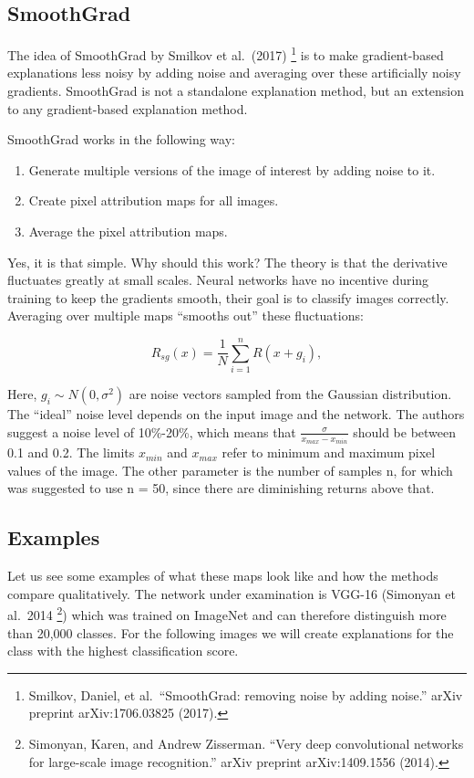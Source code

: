 \documentclass[
  10pt,
]{scrbook}
\providecommand{\tightlist}{%
  \setlength{\itemsep}{0pt}\setlength{\parskip}{0pt}}
\begin{document}
\hypertarget{smoothgrad}{%
\subsection{SmoothGrad}\label{smoothgrad}}

The idea of SmoothGrad by Smilkov et al.~(2017) \footnote{Smilkov, Daniel, et al.~``SmoothGrad: removing noise by adding noise.'' arXiv preprint arXiv:1706.03825 (2017).} is to make gradient-based explanations less noisy by adding noise and averaging over these artificially noisy gradients.
SmoothGrad is not a standalone explanation method, but an extension to any gradient-based explanation method.

SmoothGrad works in the following way:

\begin{enumerate}
\def\labelenumi{\arabic{enumi}.}
\tightlist
\item
  Generate multiple versions of the image of interest by adding noise to it.
\item
  Create pixel attribution maps for all images.
\item
  Average the pixel attribution maps.
\end{enumerate}

Yes, it is that simple.
Why should this work?
The theory is that the derivative fluctuates greatly at small scales.
Neural networks have no incentive during training to keep the gradients smooth, their goal is to classify images correctly.
Averaging over multiple maps ``smooths out'' these fluctuations:

\[R_{sg}(x)=\frac{1}{N}\sum_{i=1}^n{}R(x+g_i),\]

Here, \(g_i\sim{}N(0,\sigma^2)\) are noise vectors sampled from the Gaussian distribution.
The ``ideal'' noise level depends on the input image and the network.
The authors suggest a noise level of 10\%-20\%, which means that \(\frac{\sigma}{x_{max} - x_{min}}\) should be between 0.1 and 0.2.
The limits \(x_{min}\) and \(x_{max}\) refer to minimum and maximum pixel values of the image.
The other parameter is the number of samples n, for which was suggested to use n = 50, since there are diminishing returns above that.

\hypertarget{examples-6}{%
\subsection{Examples}\label{examples-6}}

Let us see some examples of what these maps look like and how the methods compare qualitatively.
The network under examination is VGG-16 (Simonyan et al.~2014 \footnote{Simonyan, Karen, and Andrew Zisserman. ``Very deep convolutional networks for large-scale image recognition.'' arXiv preprint arXiv:1409.1556 (2014).}) which was trained on ImageNet and can therefore distinguish more than 20,000 classes.
For the following images we will create explanations for the class with the highest classification score.
\end{document}
